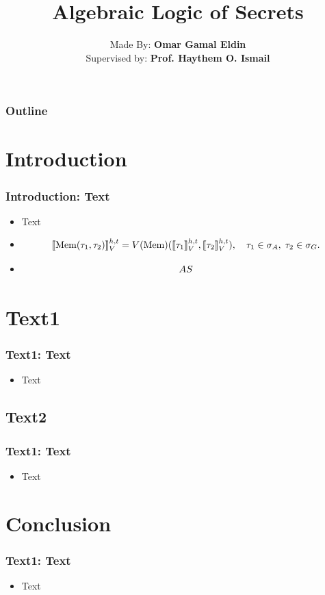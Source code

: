 \documentclass[aspectratio=169]{beamer}
\title{\Huge \textbf{Algebraic Logic of Secrets}}
\author{Made By: \textbf{Omar Gamal Eldin}\\Supervised by: \textbf{Prof. Haythem O. Ismail}}
\institute{}
\date{}
\let\mathcal\relax
\let\mathfrak\relax
\begin{document}
\frame{\titlepage}


\begin{frame}
\frametitle{Outline}
\small
\tableofcontents
\end{frame}


\section{Introduction}

\begin{frame}
\frametitle{Introduction: Text}
\begin{itemize}
    \item Text
    \item {\thesisserif
      \[
        \llbracket \text{Mem}(\tau_1, \tau_2) \rrbracket_{\mathcal{V}}^{h,t}
        = \mathcal{V}(\text{Mem})
        (\llbracket \tau_1 \rrbracket_{\mathcal{V}}^{h,t}, 
        \llbracket \tau_2 \rrbracket_{\mathcal{V}}^{h,t}),
        \quad \tau_1 \in \sigma_A, \; \tau_2 \in \sigma_G.
      \]
    }
    \item \[\mathfrak{AS}\]
\end{itemize}
\end{frame}


\section{Text1}
\begin{frame}
\frametitle{Text1: Text}
\begin{itemize}
    \item Text
\end{itemize}
\end{frame}

\subsection{Text2}

\begin{frame}
\frametitle{Text1: Text}
\begin{itemize}
    \item Text
\end{itemize}
\end{frame}



\section{Conclusion}

\begin{frame}
\frametitle{Text1: Text}
\begin{itemize}
    \item Text
\end{itemize}
\end{frame}

\end{document}
